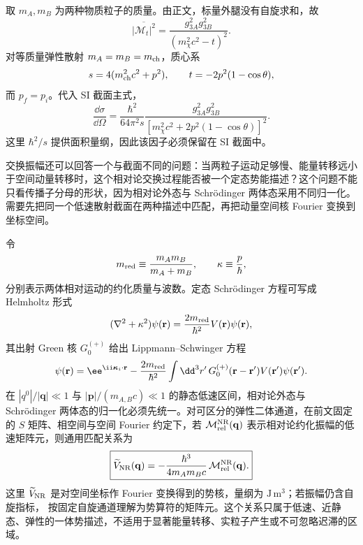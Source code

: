 \begin{exbox}[单媒介粒子交换的角分布]
取 $m_A,m_B$ 为两种物质粒子的质量。由正文，标量外腿没有自旋求和，故
\begin{equation}
 \boxed{
 \overline{|\mathcal M_t|^2}
 =\frac{g_{3A}^2g_{3B}^2}{(m_\chi^2c^2-t)^2}.}
 \label{eq:scalar-exchange-M2-r10}
\end{equation}
对等质量弹性散射 $m_A=m_B=m_{\rm ch}$，质心系
\begin{equation*}
 s=4(m_{\rm ch}^2c^2+p^2),\qquad
 t=-2p^2(1-\cos\theta),
\end{equation*}
而 $p_f=p_i$。代入 SI 截面主式，
\begin{equation}
 \boxed{
 \frac{\dd\sigma}{\dd\Omega}
 =\frac{\hbar^2}{64\pi^2s}
 \frac{g_{3A}^2g_{3B}^2}
 {[m_\chi^2c^2+2p^2(1-\cos\theta)]^2}.}
 \label{eq:scalar-exchange-angular-r10}
\end{equation}
这里 $\hbar^2/s$ 提供面积量纲，因此该因子必须保留在 SI 截面中。
\end{exbox}

交换振幅还可以回答一个与截面不同的问题：当两粒子运动足够慢、能量转移远小于空间动量转移时，这个相对论交换过程能否被一个定态势能描述？这个问题不能只看传播子分母的形状，因为相对论外态与 Schr\"odinger 两体态采用不同归一化。需要先把同一个低速散射截面在两种描述中匹配，再把动量空间核 Fourier 变换到坐标空间。

令
\begin{equation*}
 m_{\rm red}\equiv\frac{m_A m_B}{m_A+m_B},
 \qquad
 \kappa\equiv\frac{p}{\hbar},
\end{equation*}
分别表示两体相对运动的约化质量与波数。定态 Schr\"odinger 方程可写成 Helmholtz 形式
\begin{equation}
 (\nabla^2+\kappa^2)\psi(\mathbf r)
 =\frac{2m_{\rm red}}{\hbar^2}V(\mathbf r)\psi(\mathbf r),
 \label{eq:sch-helmholtz-r13}
\end{equation}
其出射 Green 核 $G_0^{(+)}$ 给出 Lippmann--Schwinger 方程
\begin{equation}
 \psi(\mathbf r)=\ee^{\ii\boldsymbol\kappa_i\cdot\mathbf r}
 -\frac{2m_{\rm red}}{\hbar^2}\int\dd^3 r'\,
 G_0^{(+)}(\mathbf r-\mathbf r')V(\mathbf r')\psi(\mathbf r').
 \label{eq:sch-lippmann-r13}
\end{equation}
在 $|q^0|/|\mathbf q|\ll1$ 与 $|\mathbf p|/(m_{A,B}c)\ll1$ 的静态低速区间，相对论外态与 Schr\"odinger 两体态的归一化必须先统一。对可区分的弹性二体通道，在前文固定的 $S$ 矩阵、相空间与空间 Fourier 约定下，若 $\mathcal M_{\rm rel}^{\rm NR}(\mathbf q)$ 表示相对论约化振幅的低速矩阵元，则通用匹配关系为
\begin{equation}
\boxed{
\widetilde V_{\rm NR}(\mathbf q)
=-\frac{\hbar^3}{4m_A m_Bc}\,
\mathcal M_{\rm rel}^{\rm NR}(\mathbf q).}
\label{eq:relativistic-to-nr-potential-matching-dp75}
\end{equation}
这里 $\widetilde V_{\rm NR}$ 是对空间坐标作 Fourier 变换得到的势核，量纲为 $\mathrm{J\,m^3}$；若振幅仍含自旋指标， 按固定自旋通道理解为势算符的矩阵元。这个关系只属于低速、近静态、弹性的一体势描述，不适用于显著能量转移、实粒子产生或不可忽略迟滞的区域。


